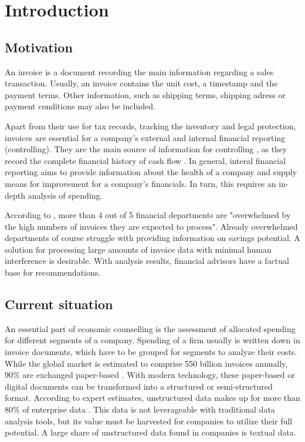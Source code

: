 \chapter{Introduction}
\section{Motivation}

An invoice is a document recording the main information regarding a sales transaction. Usually, an invoice contains the unit cost, a timestamp and the payment terms. Other information, such as shipping terms, shipping adress or payment conditions may also be included.

Apart from their use for tax records, tracking the inventory and legal protection, invoices are essential for a company's external and internal financial reporting (controlling). They are the main source of information for controlling \cite{investopediaInvoices}, as they record the complete financial history of cash flow \cite{invoicesPurpose}. In general, interal financial reporting aims to provide information about the health of a company and supply means for improvement for a company's financials. In turn, this requires an in-depth analysis of spending.

According to \cite{manualInvoiceProcessing}, more than 4 out of 5 financial departments are "overwhelmed by the high numbers of invoices they are expected to process". Already overwhelmed departments of course struggle with providing information on savings potential. A solution for processing large amounts of invoice data with minimal human interference is desirable. With analysis results, financial advisors have a factual base for recommendations.

\section{Current situation}
An essential part of economic counselling is the assessment of allocated spending for different segments of a company. Spending of a firm usually is written down in invoice documents, which have to be grouped for segments to analyze their costs.
While the global market is estimated to comprise 550 billion invoices annually, 90\% are exchanged paper-based \cite{kochEInvoicingJourney}. With modern technology, these paper-based or digital documents can be transformed into a structured or semi-structured format. According to expert estimates, unstructured data makes up for more than 80\% of enterprise data \cite{structuredAndUnstructuredData}. This data is not leverageable with traditional data analysis tools, but its value must be harvested for companies to utilize their full potential. A large share of unstructured data found in companies is textual data.

